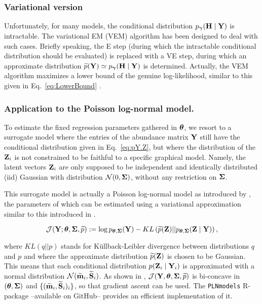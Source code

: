  \subsubsection{Variational version}
Unfortunately, for many models, the conditional distribution $p_{\boldsymbol{\gamma}}({\bf H} \mid {\bf Y})$ is intractable. The variational EM (VEM) algorithm has been designed to deal with such cases. Briefly speaking, the E step (during which the intractable conditional distribution should be evaluated) is replaced with a VE step, during which an approximate distribution $\widetilde{p}({\bf Y}) \simeq p_{\boldsymbol{\gamma}}({\bf H} \mid {\bf Y})$ is determined. Actually, the VEM algorithm maximizes a lower bound of the genuine log-likelihood, similar to this given in Eq.~\eqref{eq:LowerBound} \citep[see][for an introduction]{OrW10,BKM17}.

\subsubsection{Application to the Poisson log-normal model.} 
To estimate the fixed regression parameters gathered in ${\boldsymbol{\theta}}$, we resort to a surrogate model where the entries of the abundance matrix ${\bf Y}$ still have the conditional distribution given in Eq.~\eqref{eq:pY.Z}, but where the distribution of the ${\bf Z}_i$ is not constrained to be faithful to a specific graphical model. Namely, the latent vectors ${\bf Z}_i$ are only supposed to be independent and identically distributed (iid) Gaussian with distribution $\mathcal{N}(0, {\boldsymbol{\Sigma}})$, without any restriction on ${\boldsymbol{\Sigma}}$. 

This surrogate model is actually a Poisson log-normal model as introduced by \cite{AiH89}, the parameters of which can be estimated using a variational approximation similar to this introduced in \cite{CMR18}. 

\begin{equation}\label{eq:LowerBound}
\mathcal{J}({\bf Y}; {\boldsymbol{\theta}}, {\boldsymbol{\Sigma}}, \widetilde{p}) := \log p_{{\boldsymbol{\theta}}, {\boldsymbol{\Sigma}}}({\bf Y}) - KL\left(\widetilde{p}({\bf Z}) || p_{{\boldsymbol{\theta}}, {\boldsymbol{\Sigma}}}({\bf Z} \mid {\bf Y})\right),
\end{equation}

where $KL(q||p)$ stands for Küllback-Leibler divergence between distributions $q$ and $p$ and where the approximate distribution $\widetilde{p}({\bf Z})$ 
is chosen to be Gaussian. This means that each conditional distribution $p({\bf Z}_i \mid {\bf Y}_i)$ is approximated with a normal distribution $\mathcal{N}(\widetilde{\bf m}_i, \widetilde{\bf S}_i)$. As shown in \cite{CMR18}, $\mathcal{J}({\bf Y}, {\boldsymbol{\theta}}, {\boldsymbol{\Sigma}}, \widetilde{p})$ is bi-concave in $({\boldsymbol{\theta}}, {\boldsymbol{\Sigma}})$ and $\{(\widetilde{\bf m}_i, \widetilde{\bf S}_i)_i\}$, so that gradient ascent can be used. The {\tt PLNmodels} R-package --available on GitHub-- provides an efficient implementation of it.

